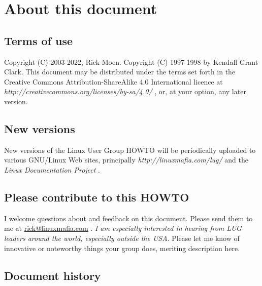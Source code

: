 
\section{About this document}


\subsection{Terms of use}



Copyright (C) 2003-2022, Rick Moen.  Copyright (C) 1997-1998 by Kendall Grant 
Clark. This document may be distributed under the terms set forth 
in the Creative Commons Attribution-ShareAlike 4.0 International licence at 
\emph{http://creativecommons.org/licenses/by-sa/4.0/} \texttt{\aeuurl}
, or, at your
option, any later version.




\subsection{New versions}

New versions of the Linux User Group HOWTO will be periodically
uploaded to various GNU/Linux Web sites, principally 
\emph{http://linuxmafia.com/lug/} \texttt{\aevurl}
 and
the 
\emph{Linux Documentation Project} \texttt{\aewurl}
.




\subsection{Please contribute to this HOWTO }

 
I welcome questions about and feedback on this document. Please send
them to me at \ifpdf
\href{mailto:rick@linuxmafia.com}{rick@linuxmafia.com}%
\else
{}%
\fi{}
. {\itshape I am especially interested in
hearing from LUG leaders around the world, especially outside the USA\/}. 
Please let me know of innovative or noteworthy things your group does,
meriting description here.




\subsection{Document history}

